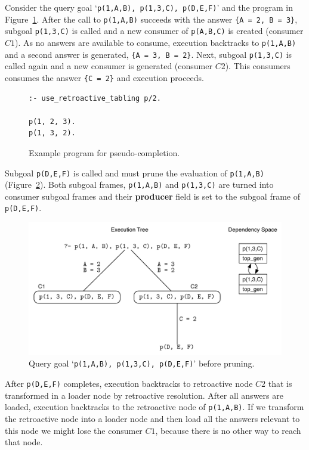 Consider the query goal `\texttt{p(1,A,B),~p(1,3,C),~p(D,E,F)}' and the program in Figure~\ref{fig:retro_ignored_consumer}. After the call to \texttt{p(1,A,B)} succeeds with the
answer \texttt{\{A~=~2,~B~=~3\}}, subgoal \texttt{p(1,3,C)} is called and a new consumer of
\texttt{p(A,B,C)} is created (consumer $C1$). As no answers are available to consume, execution
backtracks to \texttt{p(1,A,B)} and a second answer is generated, \texttt{\{A~=~3,~B~=~2\}}. Next,
subgoal \texttt{p(1,3,C)} is called again and a new consumer is generated (consumer $C2$).
This consumers consumes the answer \texttt{\{C~=~2\}} and execution proceeds. 

\begin{figure}[ht]
\begin{Verbatim}
:- use_retroactive_tabling p/2.

p(1, 2, 3).
p(1, 3, 2).
\end{Verbatim}
\caption{Example program for pseudo-completion.}
\label{fig:retro_ignored_consumer}
\end{figure}

Subgoal \texttt{p(D,E,F)} is called and must prune the evaluation of \texttt{p(1,A,B)} 
(Figure~\ref{fig:retro_pseudo_completion1}). Both subgoal frames, \texttt{p(1,A,B)} and \texttt{p(1,3,C)}
are turned into consumer subgoal frames and their \textbf{producer} field is set to the subgoal
frame of \texttt{p(D,E,F)}.

\begin{figure}[ht]
  \centering
    \includegraphics[scale=0.6]{retro_pseudo_completion1.pdf}
  \caption{Query goal `\texttt{p(1,A,B),~p(1,3,C),~p(D,E,F)}' before pruning.}
  \label{fig:retro_pseudo_completion1}
\end{figure}

After \texttt{p(D,E,F)} completes, execution backtracks to retroactive node $C2$ that is transformed
in a loader node by retroactive resolution. After all answers are loaded, execution backtracks to
the retroactive node of \texttt{p(1,A,B)}. If we transform the retroactive node into a loader node and
then load all the answers relevant to this node we might lose the consumer $C1$, because there is no
other way to reach that node.

